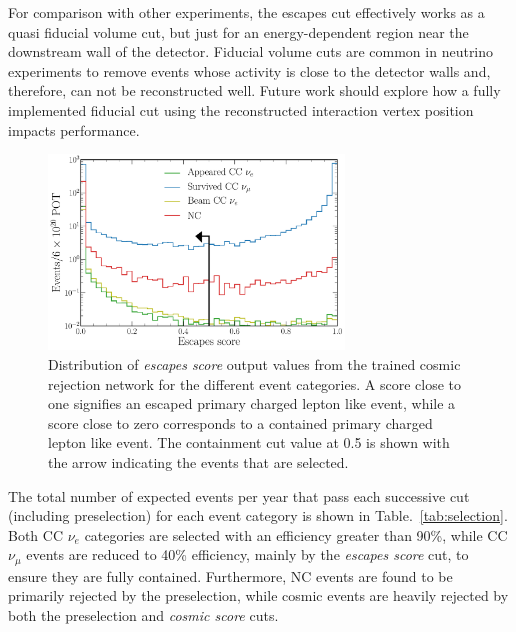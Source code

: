 For comparison with other experiments, the escapes cut effectively works as a quasi fiducial
volume cut, but just for an energy-dependent region near the downstream wall of the detector.
Fiducial volume cuts are common in neutrino experiments to remove events whose activity is close
to the detector walls and, therefore, can not be reconstructed well. Future work should explore
how a fully implemented fiducial cut using the reconstructed interaction vertex position impacts
performance.

\begin{figure} %
    \includegraphics[width=0.7\textwidth]{diagrams/7-results/final_escapes_outputs.pdf}
    \caption[Distribution of escapes score output values]
    {Distribution of \emph{escapes score} output values from the trained cosmic rejection network
        for the different event categories. A score close to one signifies an escaped primary
        charged lepton like event, while a score close to zero corresponds to a contained primary
        charged lepton like event. The containment cut value at 0.5 is shown with the arrow
        indicating the events that are selected.}
    \label{fig:final_escapes_outputs}
\end{figure}

The total number of expected events per year that pass each successive cut (including
preselection) for each event category is shown in Table.~\ref{tab:selection}. Both CC $\nu_{e}$
categories are selected with an efficiency greater than 90\%, while CC $\nu_{\mu}$ events are
reduced to 40\% efficiency, mainly by the \emph{escapes score} cut, to ensure they are fully
contained. Furthermore, NC events are found to be primarily rejected by the preselection, while
cosmic events are heavily rejected by both the preselection and \emph{cosmic score} cuts.

